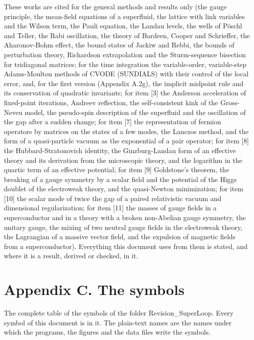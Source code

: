\documentclass[
  10pt,
]{article}
\begin{document}
These works are cited for the general methods and results only (the
gauge principle, the mean-field equations of a superfluid, the lattice
with link variables and the Wilson term, the Pauli equation, the Landau
levels, the wells of Pöschl and Teller, the Rabi oscillation, the theory
of Bardeen, Cooper and Schrieffer, the Aharonov-Bohm effect, the bound
states of Jackiw and Rebbi, the bounds of perturbation theory,
Richardson extrapolation and the Sturm-sequence bisection for
tridiagonal matrices; for the time integration the variable-order,
variable-step Adams-Moulton methods of CVODE (SUNDIALS) with their
control of the local error, and, for the first version (Appendix A.2g),
the implicit midpoint rule and its conservation of quadratic invariants;
for item {[}3{]} the Anderson acceleration of fixed-point iterations,
Andreev reflection, the self-consistent kink of the Gross-Neveu model,
the pseudo-spin description of the superfluid and the oscillation of the
gap after a sudden change; for item {[}7{]} the representation of
fermion operators by matrices on the states of a few modes, the Lanczos
method, and the form of a quasi-particle vacuum as the exponential of a
pair operator; for item {[}8{]} the Hubbard-Stratonovich identity, the
Ginzburg-Landau form of an effective theory and its derivation from the
microscopic theory, and the logarithm in the quartic term of an
effective potential; for item {[}9{]} Goldstone's theorem, the breaking
of a gauge symmetry by a scalar field and the potential of the Higgs
doublet of the electroweak theory, and the quasi-Newton minimization;
for item {[}10{]} the scalar mode of twice the gap of a paired
relativistic vacuum and dimensional regularization; for item {[}11{]}
the masses of gauge fields in a superconductor and in a theory with a
broken non-Abelian gauge symmetry, the unitary gauge, the mixing of two
neutral gauge fields in the electroweak theory, the Lagrangian of a
massive vector field, and the expulsion of magnetic fields from a
superconductor). Everything this document uses from them is stated, and
where it is a result, derived or checked, in it.

\hypertarget{appendix-c.-the-symbols}{%
\section{Appendix C. The symbols}\label{appendix-c.-the-symbols}}

The complete table of the symbols of the folder Revision\_SuperLoop.
Every symbol of this document is in it. The plain-text names are the
names under which the programs, the figures and the data files write the
symbols.
\end{document}
